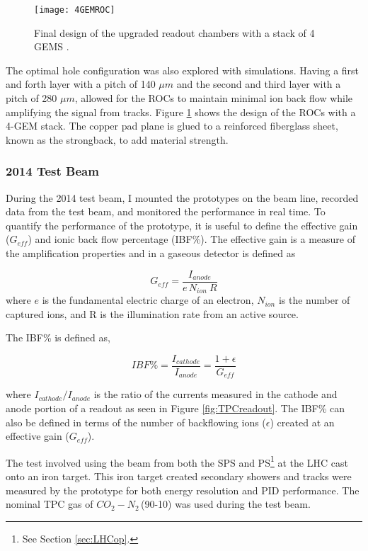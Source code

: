 \begin{figure}[h]
\texttt{[image: 4GEMROC]}
\centering
\caption{Final design of the upgraded readout chambers with a stack of 4 GEMS \cite{CERN-LHCC-2013-020}. }
\label{fig:4GEM}
\end{figure}

The optimal hole configuration was also explored with simulations.  Having a first and forth layer with a pitch of 140 $\mu m$ and the second and third layer with a pitch of 280 $\mu m$, allowed for the ROCs to maintain minimal ion back flow while amplifying the signal from tracks.  Figure \ref{fig:4GEM} shows the design of the ROCs with a 4-GEM stack.  The copper pad plane is glued to a reinforced fiberglass sheet, known as the strongback, to add material strength.

\subsubsection{2014 Test Beam}

During the 2014 test beam, I mounted the prototypes on the beam line, recorded data from the test beam, and monitored the performance in real time.  To quantify the performance of the prototype, it is useful to define the effective gain ($G_{eff}$) and ionic back flow percentage (IBF\%).  The effective gain is a measure of the amplification properties and in a gaseous detector is defined as

\begin{equation}
G_{eff}=\frac{I_{anode}}{\textit{e} \,  N_{ion} \ R}
\label{eq:gain}
\end{equation}
\noindent
where $\textit{e}$ is the fundamental electric charge of an electron, $N_{ion}$ is the number of captured ions, and R is the illumination rate from an active source.

The IBF\% is defined as,

\begin{equation}
IBF \% = \frac{ I_{cathode} }{ I_{anode} } = \frac{1 + \epsilon }{ G_{eff} }
\label{eq:IBF}
\end{equation}

\noindent
where $ I_{cathode} / I_{anode}$ is the ratio of the currents measured in the cathode and anode portion of a readout as seen in Figure \ref{fig:TPCreadout}.  The IBF\% can also be defined in terms of the number of backflowing ions ($\epsilon$) created at an effective gain ($G_{eff}$).  

The test involved using the beam from both the SPS and PS\footnote{See Section \ref{sec:LHCop}.} at the LHC cast onto an iron target.  This iron target created secondary showers and tracks were measured by the prototype for both energy resolution and PID performance.  The nominal TPC gas of $CO_{2}-N_{2}\,$(90-10) was used during the test beam.  

